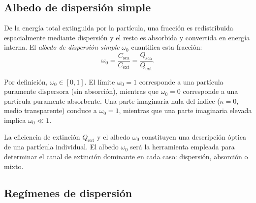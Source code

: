 
\subsection{Albedo de dispersión simple}

De la energía total extinguida por la partícula, una fracción es redistribuida
espacialmente mediante dispersión y el resto es absorbida y convertida en
energía interna. El \textit{albedo de dispersión simple} $\omega_0$ cuantifica
esta fracción:
\begin{equation}
  \label{eq:albedo}
  \omega_0 = \frac{C_{\text{sca}}}{C_{\text{ext}}}
           = \frac{Q_{\text{sca}}}{Q_{\text{ext}}}.
\end{equation}

Por definición, $\omega_0 \in [0,1]$. El límite $\omega_0 = 1$ corresponde a
una partícula puramente dispersora (sin absorción), mientras que $\omega_0 = 0$
corresponde a una partícula puramente absorbente. Una parte imaginaria nula del
índice ($\kappa = 0$, medio transparente) conduce a $\omega_0 = 1$, mientras
que una parte imaginaria elevada implica $\omega_0 \ll 1$.

La eficiencia de extinción $Q_{\text{ext}}$ y el albedo $\omega_0$ constituyen una
descripción óptica de una partícula individual. El albedo $\omega_0$ será la
herramienta empleada para determinar el canal de extinción dominante en cada
caso: dispersión, absorción o mixto.




\subsection{Regímenes de dispersión}

